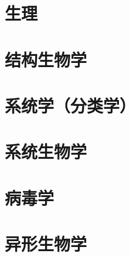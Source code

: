 \documentclass[UTF8]{NatureUniverse}
\begin{document}
\section{生理}
\section{结构生物学}
\section{系统学（分类学）}
\section{系统生物学}
\section{病毒学}
\section{异形生物学}
\end{document}
